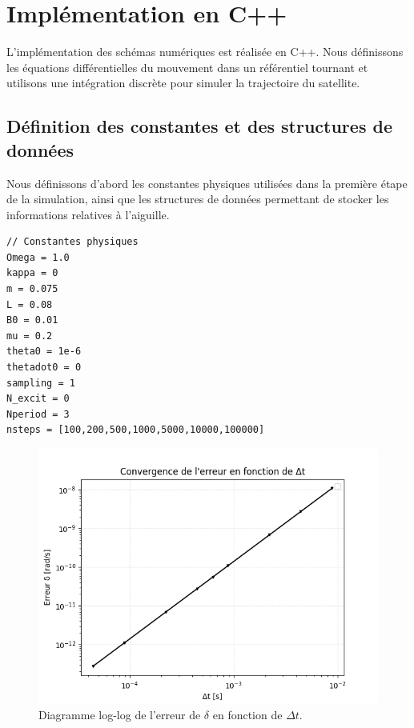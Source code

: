\documentclass[a4paper,12pt,twoside]{article}
\begin{document}
\section{Implémentation en C++}

L'implémentation des schémas numériques est réalisée en C++. Nous définissons les équations différentielles du mouvement dans un référentiel tournant et utilisons une intégration discrète pour simuler la trajectoire du satellite.

\subsection{Définition des constantes et des structures de données}

Nous définissons d'abord les constantes physiques utilisées dans la première étape de la simulation, ainsi que les structures de données permettant de stocker les informations relatives à l'aiguille.

\begin{verbatim}
// Constantes physiques
Omega = 1.0
kappa = 0
m = 0.075
L = 0.08
B0 = 0.01
mu = 0.2
theta0 = 1e-6
thetadot0 = 0
sampling = 1
N_excit = 0
Nperiod = 3
nsteps = [100,200,500,1000,5000,10000,100000]

\end{verbatim}

\hspace{1cm}

\begin{figure}
    \centering
    \includegraphics[width=1\linewidth]{graphes/question_1_log.png}
    \captionsetup{justification=centering}
    \caption{Diagramme log-log de l'erreur de $\delta$ en fonction de $\Delta t$.}
    \label{fig1}
\end{figure}
\end{document}
